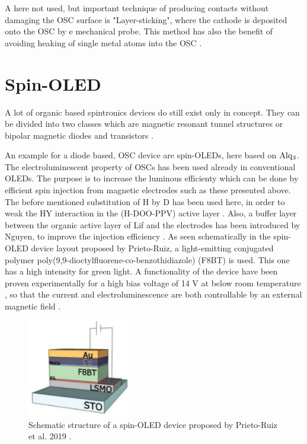 A here not used, but important technique of producing contacts without damaging the OSC surface is "Layer-sticking", where the cathode is deposited onto the OSC by e mechanical probe. 
This method has also the benefit of avoiding heaking of single metal atoms into the OSC \cite{single-crystals}.


\section{Spin-OLED}
\label{sec:device}
A lot of organic based spintronics devices do still exist only in concept.
They can be divided into two classes which are magnetic resonant tunnel structures or bipolar magnetic diodes and transistors \cite{SC-spintronics}.

An example for a diode based, OSC device are spin-OLEDs, here based on $\ce{Alq_3}$.
The electroluminescent property of OSCs has been used already in conventional OLEDs.
The purpose is to increase the luminous efficienty which can be done by efficient spin injection from magnetic electrodes such as these presented above.
The before mentioned substitution of H by D has been used here, in order to weak the HY interaction in the (H-DOO-PPV) active layer \cite{appl-organic}.
Also, a buffer layer between the organic active layer of Lif and the electrodes has been introduced by Nguyen, to improve the injection efficiency \cite{spin-OLED}.
As seen schematically in the spin-OLED device layout proposed by Prieto-Ruiz, a light-emitting conjugated polymer poly(9,9-dioctylfluorene-co-benzothidiazole) (F8BT) is used.
This one has a high intensity for green light.
A functionality of the device have been proven experimentally for a high bias voltage of 14 V at below room temperature \cite{appl-organic},
so that the current and electroluminescence are both controllable by an external magnetic field \cite{single-crystals}.

\begin{figure}
    \centering
  \captionsetup{width=0.9\linewidth}
  \includegraphics[width=0.4\textwidth]{graphics/oled.png}
  \caption{Schematic structure of a spin-OLED device proposed by Prieto-Ruiz et al. 2019 \cite{appl-organic}.}
  \label{fig:oled}
\end{figure}




